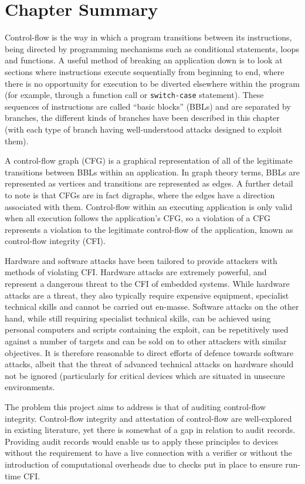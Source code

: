 \section{Chapter Summary}
Control-flow is the way in which a program transitions between its instructions, being directed by programming mechanisms such as conditional statements, loops and functions. A useful method of breaking an application down is to look at sections where instructions execute sequentially from beginning to end, where there is no opportunity for execution to be diverted elsewhere within the program (for example, through a function call or \verb|switch-case| statement). These sequences of instructions are called ``basic blocks'' (BBLs) and are separated by branches, the different kinds of branches have been described in this chapter (with each type of branch having well-understood attacks designed to exploit them).

A control-flow graph (CFG) is a graphical representation of all of the legitimate transitions between BBLs within an application. In graph theory terms, BBLs are represented as vertices and transitions are represented as edges. A further detail to note is that CFGs are in fact digraphs, where the edges have a direction associated with them. Control-flow within an executing application is only valid when all execution follows the application's CFG, so a violation of a CFG represents a violation to the legitimate control-flow of the application, known as control-flow integrity (CFI).

Hardware and software attacks have been tailored to provide attackers with methods of violating CFI. Hardware attacks are extremely powerful, and represent a dangerous threat to the CFI of embedded systems. While hardware attacks are a threat, they also typically require expensive equipment, specialist technical skills and cannot be carried out en-masse. Software attacks on the other hand, while still requiring specialist technical skills, can be achieved using personal computers and scripts containing the exploit, can be repetitively used against a number of targets and can be sold on to other attackers with similar objectives. It is therefore reasonable to direct efforts of defence towards software attacks, albeit that the threat of advanced technical attacks on hardware should not be ignored (particularly for critical devices which are situated in unsecure environments.

The problem this project aims to address is that of auditing control-flow integrity. Control-flow integrity and attestation of control-flow are well-explored in existing literature, yet there is somewhat of a gap in relation to audit records.  Providing audit records would enable us to apply these principles to devices without the requirement to have a live connection with a verifier or without the introduction of computational overheads due to checks put in place to ensure run-time CFI.